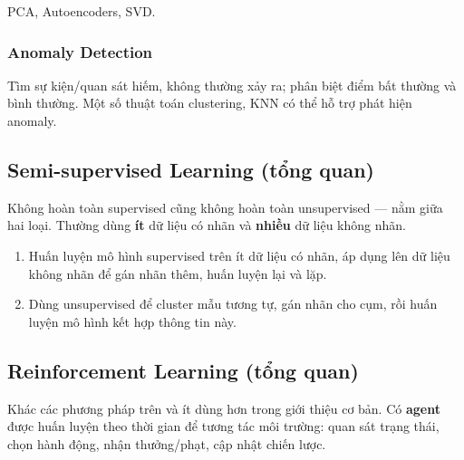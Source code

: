 \begin{phuongphap}[title={Mô hình giảm chiều}]
PCA, Autoencoders, SVD.
\end{phuongphap}

\subsubsection{Anomaly Detection}

\begin{ynghia}[title={Phát hiện bất thường}]
Tìm sự kiện/quan sát hiếm, không thường xảy ra; phân biệt điểm bất thường và bình thường.
Một số thuật toán clustering, KNN có thể hỗ trợ phát hiện anomaly.
\end{ynghia}

\subsection{Semi-supervised Learning (tổng quan)}

\begin{dinhnghia}[title={Học bán giám sát}]
Không hoàn toàn supervised cũng không hoàn toàn unsupervised --- nằm giữa hai loại.
Thường dùng \textbf{ít} dữ liệu có nhãn và \textbf{nhiều} dữ liệu không nhãn.
\end{dinhnghia}

\begin{phuongphap}[title={Hai hướng triển khai}]
\begin{enumerate}
  \item Huấn luyện mô hình supervised trên ít dữ liệu có nhãn, áp dụng lên dữ liệu không nhãn để gán nhãn thêm, huấn luyện lại và lặp.
  \item Dùng unsupervised để cluster mẫu tương tự, gán nhãn cho cụm, rồi huấn luyện mô hình kết hợp thông tin này.
\end{enumerate}
\end{phuongphap}

\subsection{Reinforcement Learning (tổng quan)}

\begin{dinhnghia}[title={Học tăng cường}]
Khác các phương pháp trên và ít dùng hơn trong giới thiệu cơ bản.
Có \textbf{agent} được huấn luyện theo thời gian để tương tác môi trường: quan sát trạng thái, chọn hành động, nhận thưởng/phạt, cập nhật chiến lược.
\end{dinhnghia}

